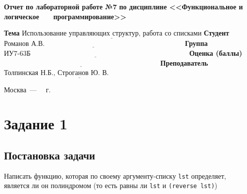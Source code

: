 \documentclass[12pt]{report}
\begin{document}
\begin{titlepage}
		\begin{center}
			\noindent\begin{minipage}{1.1\textwidth}\centering
				\Large\textbf{  Отчет по лабораторной работе №7}\newline
				\textbf{по дисциплине <<Функциональное и логическое}\newline
				\textbf{~~~программирование>>}\newline\newline
			\end{minipage}
		\end{center}
		
		\noindent\textbf{Тема} $\underline{\text{Использование управляющих структур, работа со списками}}$\newline\newline
		\noindent\textbf{Студент} $\underline{\text{Романов А.В.~~~~~~~~~~~~~~~~~~~~~~~~~~~~~~~~~~~~~~~~~~~~~~~~~~~~~~~~~~~~}}$\newline\newline
		\noindent\textbf{Группа} $\underline{\text{ИУ7-63Б~~~~~~~~~~~~~~~~~~~~~~~~~~~~~~~~~~~~~~~~~~~~~~~~~~~~~~~~~~~~~~~~~~~~}}$\newline\newline
		\noindent\textbf{Оценка (баллы)} $\underline{\text{~~~~~~~~~~~~~~~~~~~~~~~~~~~~~~~~~~~~~~~~~~~~~~~~~~~~~~~~~~~~~~~~~~~}}$\newline\newline
		\noindent\textbf{Преподаватель} $\underline{\text{Толпинская Н.Б., Строганов Ю. В.~~~~~~~~~~~~~~~~~~~~}}$\newline\newline\newline
		
		\begin{center}
			\vfill
			Москва~---~\the\year
			~г.
		\end{center}
	\end{titlepage}
	
	
\section*{Задание 1}
\subsection*{Постановка задачи}
Написать функцию, которая по своему аргументу-списку \texttt{lst} определяет, является ли он полиндромом (то есть равны ли \texttt{lst} и \texttt{(reverse lst)})
\end{document}
